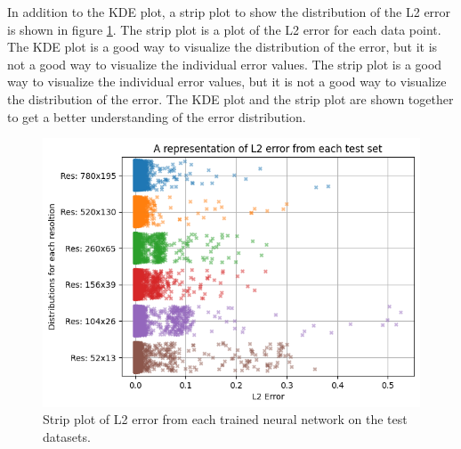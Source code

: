 In addition to the KDE plot, a strip plot to show the distribution of the L2 error is shown in figure \ref{fig:strip}. The strip plot is a plot of the L2 error for each data point. The KDE plot is a good way to visualize the distribution of the error, but it is not a good way to visualize the individual error values. The strip plot is a good way to visualize the individual error values, but it is not a good way to visualize the distribution of the error. The KDE plot and the strip plot are shown together to get a better understanding of the error distribution.

\begin{figure}[!htb]
    \centering
    \includegraphics[width = \textwidth]{images/strip_plot.png}
    \caption{Strip plot of L2 error from each trained neural network on the test datasets.} \label{fig:strip}
\end{figure}